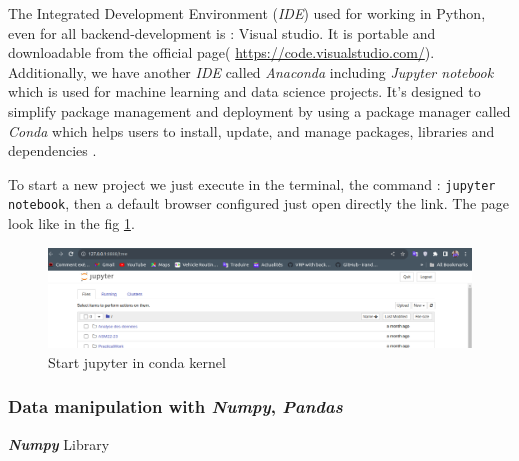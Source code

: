 \documentclass[12pt,a4paper]{report}
\begin{document}
The Integrated Development Environment (\textit{IDE}) used for working in Python, even for all backend-development is : Visual studio. It is portable and downloadable from the official page( \url{https://code.visualstudio.com/}). Additionally, we have another \textit{IDE} called \textit{Anaconda} including \textit{Jupyter notebook} which is used for machine learning and data science projects. It's designed to simplify package management and deployment by using a package manager called \textit{Conda} which helps users to install, update, and manage packages, libraries and dependencies \cite{teimourzadeh2022application}.

To start a new project we just execute in the terminal, the command :  \texttt{jupyter notebook}, then a default browser configured just open directly the link. The page look like in the fig \ref{fig:jupyteropen}.
\begin{figure}
	\centering
	\includegraphics[width=1\linewidth]{jupyterOpen}
	\caption{Start jupyter in conda kernel}
	\label{fig:jupyteropen}
\end{figure}  

\subsubsection{{\large Data manipulation with \textit{Numpy}, \textit{Pandas}}}
  \textit{\textbf{Numpy}} Library
 
\end{document}
